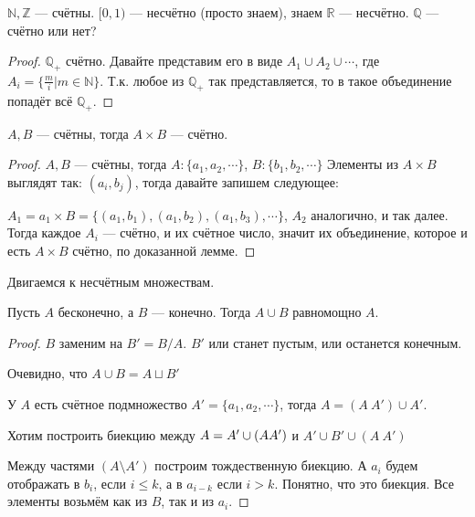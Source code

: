 \begin{exerc}
	$\mathbb{N}, \mathbb{Z}$ --- счётны. $[0, 1)$ --- несчётно (просто знаем), знаем $\mathbb{R}$ --- несчётно. $\mathbb{Q}$ --- счётно или нет?
\end{exerc}

\begin{proof}
	$\mathbb{Q}_+$ счётно. Давайте представим его в виде $A_1 \cup A_2 \cup \cdots$, где $A_i = \{\frac{m}i | m \in \mathbb{N}\}$. Т.к. любое из $\mathbb{Q}_+$ так представляется, то в такое объединение попадёт всё $\mathbb{Q}_+$.
\end{proof}
\begin{lemma}
	$A, B$ --- счётны, тогда $A \times B$ --- счётно.
\end{lemma}
\begin{proof}
	$A, B$ --- счётны, тогда $A: \{a_1, a_2, \cdots\}$, $B: \{b_1, b_2, \cdots\}$
	Элементы из $A \times B$ выглядят так: $(a_i, b_j)$, тогда давайте запишем следующее:

	$A_1 = a_1 \times B = \{(a_1, b_1), (a_1, b_2), (a_1, b_3), \cdots\}$, $A_2$ аналогично, и так далее.
	Тогда каждое $A_i$ --- счётно, и их счётное число, значит их объединение, которое и есть $A \times B$ счётно, по доказанной лемме.
\end{proof}

Двигаемся к несчётным множествам.

\begin{lemma}
Пусть $A$ бесконечно, а $B$ --- конечно. Тогда $A \cup B$ равномощно $A$.
\end{lemma}
\begin{proof}
	$B$ заменим на $B' = B / A$. $B'$ или станет пустым, или останется конечным.

	Очевидно, что $A \cup B = A \sqcup B'$

	У $A$ есть счётное подмножество $A' = \{a_1, a_2, \cdots\}$, тогда $A = (A\ A') \cup A'$.

	Хотим построить биекцию между $A = A' \cup (A\\ A')$ и $A' \cup B' \cup (A\ A')$

	Между частями $(A \setminus A')$ построим тождественную биекцию. А $a_i$ будем отображать в $b_i$, если $i \le k$, а в $a_{i-k}$ если $i > k$. Понятно, что это биекция. Все элементы возьмём как из $B$, так и из $a_i$.
\end{proof}

